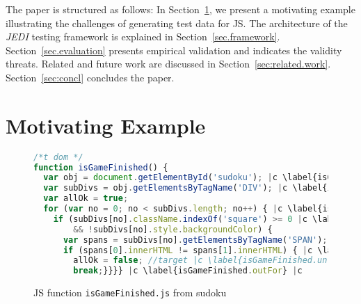 \documentclass[sigconf,review]{acmart}
\begin{document}
The paper is structured as follows: In Section~\ref{sec.example}, we present a motivating example illustrating the challenges of generating test data for JS. The architecture of the \emph{JEDI} testing framework is explained in Section~\ref{sec.framework}. Section~\ref{sec.evaluation} presents empirical validation and indicates the validity threats. Related and future work are discussed in Section~\ref{sec:related.work}. Section~\ref{sec:concl} concludes the paper.  


\section{Motivating Example}
\label{sec.example}

\begin{figure}[t]
  \begin{lstlisting}[style=htmlcssjs,language=JavaScript]
/*t dom */
function isGameFinished() {
  var obj = document.getElementById('sudoku'); |c \label{isGameFinished.getSudoku} |c
  var subDivs = obj.getElementsByTagName('DIV'); |c \label{isGameFinished.getDivs} |c
  var allOk = true;
  for (var no = 0; no < subDivs.length; no++) { |c \label{isGameFinished.inFor.begin} |c
    if (subDivs[no].className.indexOf('square') >= 0 |c \label{isGameFinished.if1.begin} |c 
        && !subDivs[no].style.backgroundColor) { 
      var spans = subDivs[no].getElementsByTagName('SPAN');
      if (spans[0].innerHTML != spans[1].innerHTML) { |c \label{isGameFinished.if2.begin} |c
        allOk = false; //target |c \label{isGameFinished.unfinished} |c
        break;}}}} |c \label{isGameFinished.outFor} |c
\end{lstlisting}
  \caption{JS function \texttt{isGameFinished.js} from sudoku}
  \label{code.isGameFinished}
\end{figure}
\end{document}
